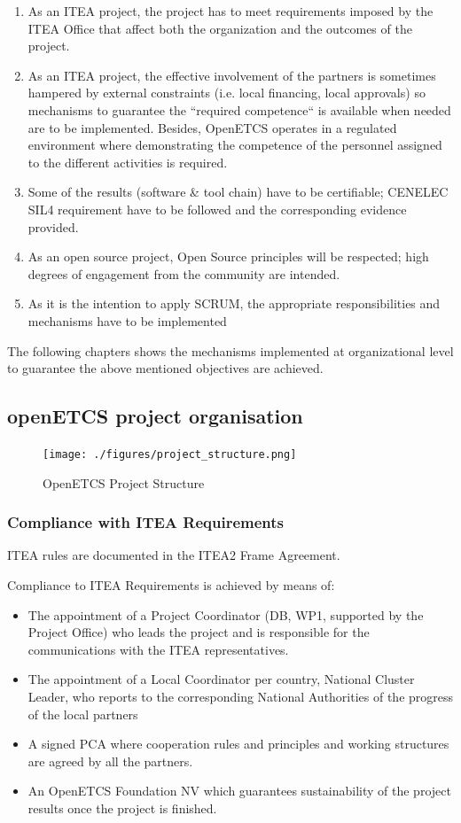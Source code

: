 \documentclass{template/openetcs_article}
\begin{document}
\begin{enumerate}
\item As an ITEA project, the project has to meet requirements imposed by the ITEA Office that affect both the organization and the outcomes of the project.
\item As an ITEA project, the effective involvement of the partners is sometimes hampered by external constraints (i.e. local financing, local approvals) so mechanisms to guarantee the “required competence“ is available when needed are to be implemented. Besides, OpenETCS operates in a regulated environment where demonstrating the competence of the personnel assigned to the different activities is required. 
\item Some of the results (software \& tool chain) have to be certifiable; CENELEC SIL4 requirement \citep{EN50128} have to be followed and the corresponding evidence provided. 
\item As an open source project, Open Source principles will be respected; high degrees of engagement from the community are intended.
\item As it is the intention to apply SCRUM, the appropriate responsibilities and mechanisms have to be implemented
\end{enumerate}

The following chapters shows the mechanisms implemented at organizational level to guarantee the above mentioned objectives are achieved.


\subsection{openETCS project organisation}

\begin{figure}[H]
\centering
\texttt{[image: ./figures/project\_structure.png]}
\caption{OpenETCS Project Structure}
\end{figure}

\subsubsection{Compliance with ITEA Requirements}
ITEA rules are documented in the ITEA2 Frame Agreement.

Compliance to ITEA Requirements is achieved by means of:
\begin{itemize}
\item The appointment of a Project Coordinator (DB, WP1, supported by the Project Office) who leads the project and is responsible for the communications with the ITEA representatives. 
\item The appointment of a Local Coordinator per country, National Cluster Leader, who reports to the corresponding National Authorities of the progress of the local partners
\item A signed PCA where cooperation rules and principles and working structures are agreed by all the partners.
\item An OpenETCS Foundation NV which guarantees sustainability of the project results once the project is finished.
\end{itemize}
\end{document}
